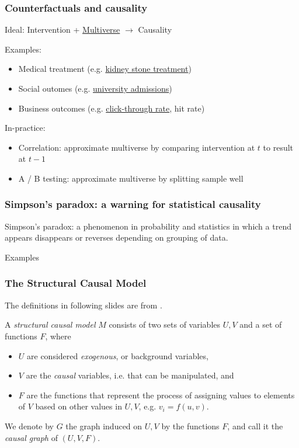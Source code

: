 \begin{frame}
\frametitle{Counterfactuals and causality}
Ideal: Intervention + \href{https://en.wikipedia.org/wiki/Multiverse}{Multiverse} $\rightarrow$ Causality\newline

Examples:
\begin{itemize}
\item Medical treatment (e.g. \href{https://en.wikipedia.org/wiki/Simpson\%27s_paradox\#Kidney_stone_treatment}{kidney stone treatment})
\item Social outomes (e.g. \href{https://en.wikipedia.org/wiki/Simpson\%27s_paradox\#UC_Berkeley_gender_bias}{university admissions})
\item Business outcomes (e.g. \href{https://en.wikipedia.org/wiki/Click-through\_rate}{click-through rate}, hit rate)\newline
\end{itemize}

In-practice:
\begin{itemize}
    \item Correlation: approximate multiverse by comparing intervention at $t$ to result at $t-1$
    \item A / B testing: approximate multiverse by splitting sample well
\end{itemize}
\end{frame}

\begin{frame}
\frametitle{Simpson's paradox: a warning for statistical causality}
Simpson's paradox: a phenomenon in probability and statistics in which a trend appears disappears or reverses depending on grouping of data.

Examples
\cite{simpsons-wikipedia}
\end{frame}

\begin{frame}
    \frametitle{The Structural Causal Model}
    The definitions in following slides are from \cite{pearl2007mathematics}.

    A \emph{structural causal model} $M$ consists of two sets of variables $U, V$ and a set of functions $F$, where 
    
    \begin{itemize}
        \item $U$ are considered \emph{exogenous}, or background variables, 
        \item $V$ are the \emph{causal} variables, i.e. that can be manipulated, and
        \item $F$ are the functions that represent the process of assigning values to elements of $V$ based on other values in $U, V$, e.g. $v_i = f(u, v)$.
    \end{itemize}

    We denote by $G$ the graph induced on $U, V$ by the functions $F$, and call it the \emph{causal graph} of $(U, V, F)$.
\end{frame}

